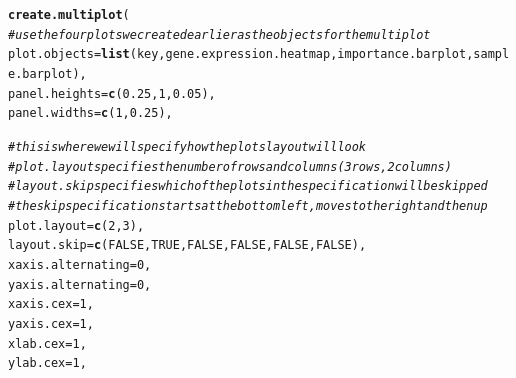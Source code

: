 \documentclass[letterpaper]{article}\usepackage[]{graphicx}\usepackage[]{color}
\makeatletter
\newcommand{\hlnum}[1]{\textcolor[rgb]{0.686,0.059,0.569}{#1}}%
\newcommand{\hlcom}[1]{\textcolor[rgb]{0.678,0.584,0.686}{\textit{#1}}}%
\newcommand{\hlstd}[1]{\textcolor[rgb]{0.345,0.345,0.345}{#1}}%
\newcommand{\hlkwc}[1]{\textcolor[rgb]{0.333,0.667,0.333}{#1}}%
\newcommand{\hlkwd}[1]{\textcolor[rgb]{0.737,0.353,0.396}{\textbf{#1}}}%
\newenvironment{kframe}{%
 \def\at@end@of@kframe{}%
 \ifinner\ifhmode%
  \def\at@end@of@kframe{\end{minipage}}%
  \begin{minipage}{\columnwidth}%
 \fi\fi%
 \def\FrameCommand##1{\hskip\@totalleftmargin \hskip-\fboxsep
 \colorbox{shadecolor}{##1}\hskip-\fboxsep
     \hskip-\linewidth \hskip-\@totalleftmargin \hskip\columnwidth}%
 \MakeFramed {\advance\hsize-\width
   \@totalleftmargin\z@ \linewidth\hsize
   \@setminipage}}%
 {\par\unskip\endMakeFramed%
 \at@end@of@kframe}
\newenvironment{knitrout}{}{} %
\makeatother
\begin{document}
\begin{knitrout}
\color{fgcolor}\begin{kframe}
\begin{alltt}
\hlkwd{create.multiplot}\hlstd{(}
    \hlcom{# use the four plots we created earlier as the objects for the multiplot}
    \hlkwc{plot.objects} \hlstd{=} \hlkwd{list}\hlstd{(key, gene.expression.heatmap, importance.barplot, sample.barplot),}
    \hlkwc{panel.heights} \hlstd{=} \hlkwd{c}\hlstd{(}\hlnum{0.25}\hlstd{,} \hlnum{1}\hlstd{,} \hlnum{0.05}\hlstd{),}
    \hlkwc{panel.widths} \hlstd{=} \hlkwd{c}\hlstd{(}\hlnum{1}\hlstd{,} \hlnum{0.25}\hlstd{),}

    \hlcom{# this is where we will specify how the plots layout will look}
    \hlcom{# plot.layout specifies the number of rows and columns (3 rows, 2 columns)}
    \hlcom{# layout.skip specifies which of the plots in the specification will be skipped}
    \hlcom{# the skip specification starts at the bottom left, moves to the right and then up}
    \hlkwc{plot.layout} \hlstd{=} \hlkwd{c}\hlstd{(}\hlnum{2}\hlstd{,} \hlnum{3}\hlstd{),}
    \hlkwc{layout.skip} \hlstd{=} \hlkwd{c}\hlstd{(}\hlnum{FALSE}\hlstd{,} \hlnum{TRUE}\hlstd{,} \hlnum{FALSE}\hlstd{,} \hlnum{FALSE}\hlstd{,} \hlnum{FALSE}\hlstd{,} \hlnum{FALSE}\hlstd{),}
    \hlkwc{xaxis.alternating} \hlstd{=} \hlnum{0}\hlstd{,}
    \hlkwc{yaxis.alternating} \hlstd{=} \hlnum{0}\hlstd{,}
    \hlkwc{xaxis.cex} \hlstd{=} \hlnum{1}\hlstd{,}
    \hlkwc{yaxis.cex} \hlstd{=} \hlnum{1}\hlstd{,}
    \hlkwc{xlab.cex} \hlstd{=} \hlnum{1}\hlstd{,}
    \hlkwc{ylab.cex} \hlstd{=} \hlnum{1}\hlstd{,}


\end{alltt}
\end{kframe}
\end{knitrout}
\end{document}
